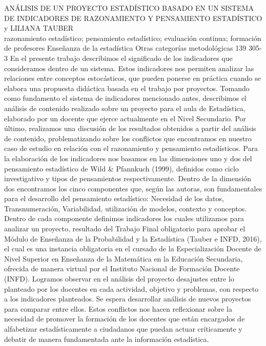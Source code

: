 \A
{ANÁLISIS DE UN PROYECTO ESTADÍSTICO BASADO EN UN SISTEMA DE INDICADORES DE RAZONAMIENTO Y PENSAMIENTO ESTADÍSTICO}
{ y LILIANA TAUBER}
{
\\}
{razonamiento estadístico; pensamiento estadístico; evaluación continua; formación de profesores} 
 {Enseñanza de la estadística} 
 {Otras categorías metodológicas} 
 {139} 
 {305-3}
{En el presente trabajo describimos el significado de los indicadores que consideramos dentro de un sistema. Estos indicadores nos permiten analizar las relaciones entre conceptos estocásticos, que pueden ponerse en práctica cuando se elabora una propuesta didáctica basada en el trabajo por proyectos. Tomando como fundamento el sistema de indicadores mencionado antes, describimos el análisis de contenido realizado sobre un proyecto para el aula de Estadística, elaborado por un docente que ejerce actualmente en el Nivel Secundario. Por último, realizamos una discusión de los resultados obtenidos a partir del análisis de contenido, problematizando sobre los conflictos que encontramos en nuestro caso de estudio en relación con el razonamiento y pensamiento estadísticos. Para la elaboración de los indicadores nos basamos en las dimensiones uno y dos del pensamiento estadístico de Wild \& Pfannkuch (1999), definidos como ciclo investigativo y tipos de pensamientos respectivamente. Dentro de la dimensión dos encontramos los cinco componentes que, según las autoras, son fundamentales para el desarrollo del pensamiento estadístico: Necesidad de los datos, Transnumeración, Variabilidad, utilización de modelos, contexto y conceptos. Dentro de cada componente definimos indicadores los cuales utilizamos para analizar un proyecto, resultado del Trabajo Final obligatorio para aprobar el Módulo de Enseñanza de la Probabilidad y la Estadística (Tauber e INFD, 2016), el cual es una instancia obligatoria en el cursado de la Especialización Docente de Nivel Superior en Enseñanza de la Matemática en la Educación Secundaria, ofrecida de manera virtual por el Instituto Nacional de Formación Docente (INFD). Logramos observar en el análisis del proyecto desajustes entre lo planteado por los docentes en cada actividad, objetivo y problemas, con respecto a los indicadores planteados. Se espera desarrollar análisis de nuevos proyectos para comparar entre ellos. Estos conflictos nos hacen reflexionar sobre la necesidad de promover la formación de los docentes que están encargados de alfabetizar estadísticamente a ciudadanos que puedan actuar críticamente y debatir de manera fundamentada ante la información estadística.}
